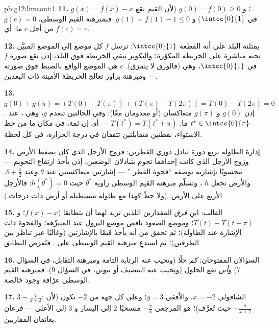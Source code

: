 \begin{solution}{pb:g12:limcont:1}
\textbf{11.} $g(x) = f(x) - x$ ؛ و
$g(0) = f(0) \geq 0$ (لأن القيم تقع في $\intcc{0}{1}$) و
$g(1) = f(1) - 1 \leq 0$. فبمبرهنة القيم الوسطى، $g(c) = 0$ من أجل $c$ ما:
أي $f(c) = c$.

\textbf{12.} بمثلنة البلد على أنه القطعة
$\intcc{0}{1}$: ترسل $f$ كل موضع إلى الموضع المبيَّن
تحته مباشرة على الخريطة المكوّرة؛ والتكوير يبقي
الخريطة فوق البلد، إذن تقع صورة $f$ في $\intcc{0}{1}$، وهي
 (فالورق لا يتمزق).  $c$ هي
الموضع الواقع بالضبط فوق صورته --- ومبرهنة براور
تعالج الخريطة الأمينة ذات البعدين.

\textbf{13.} $g(0) + g(\pi) = \left(T(0) - T(\pi)\right) +
\left(T(\pi) - T(2\pi)\right) = T(0) - T(2\pi) = 0$. إذن
$g(0)$ و $g(\pi)$ متعاكسان (أو معدومان معًا): وفي الحالتين
تنعدم $g$، وهي ، عند $t^* \in \intcc{0}{\pi}$ ما:
$T(t^*) = T(t^* + \pi)$ --- أي إن ثمة، في مكان ما من خط الاستواء، نقطتين
متقابلتين تتفقان في درجة الحرارة، في كل
لحظة.

\textbf{14.} إدارة الطاولة بربع دورة تبادل
دوري القطرين: فزوج الأرجل الذي كان يضغط
الأرض وزوج الأرجل الذي كانت إحداهما تحوم يتبادلان
الوضعين، إذن يأخذ ارتفاع التحويم --- محسوبًا بإشارته
بوصفه ``فجوة القطر '' --- إشارتين متعاكستين
عند $\theta$ وعند $\theta + \frac\pi2$. والأرض 
تجعل $h$ ، وتسلّم مبرهنة القيم الوسطى زاوية
$\theta^*$ حيث $h(\theta^*) = 0$: فالأرجل الأربع على الأرض. (ولا
حظّ كهذا مع طاولة مستطيلة أو أرض ذات درجات.)

\textbf{15.} القالب: ابنِ \emph{فرق} المقدارين
اللذين تريد لهما أن يتطابقا ($f(x) - x$؛
و $T(t) - T(t + \pi)$؛ وموضع الصعود ناقص موضع النزول عند
المتنزّهة؛ والفجوة ذات الإشارة عند الطاولة)؛ ثم تحقق من أنه يأخذ قيمًا
بالإشارتين (وغالبًا عبر تناظر بين الطرفين)؛ ثم استدعِ مبرهنة القيم الوسطى
على . فيُفرَض التطابق.

\textbf{16.} السؤالان المفتوحان: \emph{كم} حلًا
(وتجيب عنه الرتابة التامة ومبرهنة التقابل، في
السؤال 7) و\emph{أين} تقع الحلول (ويجيب عنه التنصيف
أو نيوتن، في السؤال 9). فمبرهنة القيم الوسطى عرّافة وجود خالصة.

\textbf{17.} $3 - \frac{7}{x + 2}$:  الشاقولي
$x = -2$، والأفقي $y = 3$؛ وعلى كل جهة من $-2$ تكون
 (لأن $-\frac{7}{x+2}$  حيث
تُعرَّف)؛  هو  المرجعي
$-\frac7x$ منسحبًا $2$ إلى اليسار و $3$ إلى الأعلى --- فرعان
يعانقان  المقاربين.


\end{solution}
